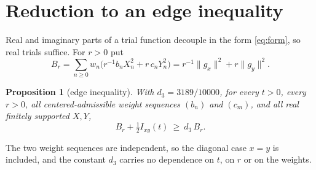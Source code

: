 \documentclass[10pt]{article}
\newtheorem{proposition}[theorem]{Proposition}
\theoremstyle{remark}
\newcommand{\dthree}{d_{3}}
\begin{document}
\section{Reduction to an edge inequality}\label{sec:reduction}

Real and imaginary parts of a trial function decouple in the form \eqref{eq:form}, so real trials suffice. For $r>0$ put
\[
B_r=\sum_{n\ge0}w_n\bigl(r^{-1}b_nX_n^2+r\,c_nY_n^2\bigr)=r^{-1}\|g_x\|^2+r\|g_y\|^2 .
\]

\begin{proposition}[edge inequality]\label{prop:edge}
With $\dthree=3189/10000$, for every $t>0$, every $r>0$, all centered-admissible weight sequences $(b_n)$ and $(c_m)$, and all real finitely supported $X,Y$,
\begin{equation}\label{eq:edge}
B_r+\tfrac12 I_{xy}(t)\ \ge\ \dthree\,B_r .
\end{equation}
\end{proposition}

The two weight sequences are independent, so the diagonal case $x=y$ is included, and the constant $\dthree$ carries no dependence on $t$, on $r$ or on the weights.
\end{document}

